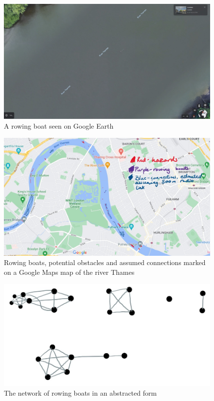 \documentclass[12pt,a4paper]{report}
\begin{document}
\begin{figure}[h]
\caption{A rowing boat seen on Google Earth \cite{earth}}
\begin{center}
\includegraphics[scale=0.2]{earthSculler.jpg}
\end{center}
\end{figure}
\begin{figure}[h]
\caption{Rowing boats, potential obstacles and assumed connections marked on a Google Maps map of the river Thames}
\begin{center}
\includegraphics[scale=0.4]{mapsmarked.jpg}
\end{center}
\end{figure}
\begin{figure}[h]
\begin{center}
\caption{The network of rowing boats in an abstracted form}
\includegraphics[scale=0.5]{lines.jpg}
\end{center}
\end{figure}
\FloatBarrier
\end{document}
